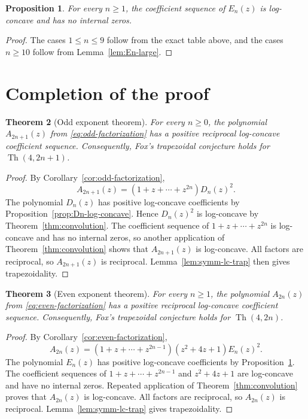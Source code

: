 \documentclass[11pt]{amsart}
\newtheorem{theorem}{Theorem}[section]
\newtheorem{proposition}[theorem]{Proposition}
\newcommand{\Th}{\operatorname{Th}}
\begin{document}
\begin{proposition}\label{prop:En-log-concave}
For every \(n\ge1\), the coefficient sequence of \(E_n(z)\) is log-concave and has no internal zeros.
\end{proposition}

\begin{proof}
The cases \(1\le n\le9\) follow from the exact table above, and the cases \(n\ge10\) follow from Lemma~\ref{lem:En-large}.
\end{proof}

\section{Completion of the proof}\label{sec:completion}

\begin{theorem}[Odd exponent theorem]\label{thm:odd-main}
For every \(n\ge0\), the polynomial \(A_{2n+1}(z)\) from \eqref{eq:odd-factorization} has a positive reciprocal log-concave coefficient sequence.  Consequently, Fox's trapezoidal conjecture holds for \(\Th(4,2n+1)\).
\end{theorem}

\begin{proof}
By Corollary~\ref{cor:odd-factorization},
\[
        A_{2n+1}(z)=(1+z+\cdots+z^{2n})D_n(z)^2.
\]
The polynomial \(D_n(z)\) has positive log-concave coefficients by Proposition~\ref{prop:Dn-log-concave}.  Hence \(D_n(z)^2\) is log-concave by Theorem~\ref{thm:convolution}.  The coefficient sequence of \(1+z+\cdots+z^{2n}\) is log-concave and has no internal zeros, so another application of Theorem~\ref{thm:convolution} shows that \(A_{2n+1}(z)\) is log-concave.  All factors are reciprocal, so \(A_{2n+1}(z)\) is reciprocal.  Lemma~\ref{lem:symm-lc-trap} then gives trapezoidality.
\end{proof}

\begin{theorem}[Even exponent theorem]\label{thm:even-main}
For every \(n\ge1\), the polynomial \(A_{2n}(z)\) from \eqref{eq:even-factorization} has a positive reciprocal log-concave coefficient sequence.  Consequently, Fox's trapezoidal conjecture holds for \(\Th(4,2n)\).
\end{theorem}

\begin{proof}
By Corollary~\ref{cor:even-factorization},
\[
        A_{2n}(z)=(1+z+\cdots+z^{2n-1})(z^2+4z+1)E_n(z)^2.
\]
The polynomial \(E_n(z)\) has positive log-concave coefficients by Proposition~\ref{prop:En-log-concave}.  The coefficient sequences of \(1+z+\cdots+z^{2n-1}\) and \(z^2+4z+1\) are log-concave and have no internal zeros.  Repeated application of Theorem~\ref{thm:convolution} proves that \(A_{2n}(z)\) is log-concave.  All factors are reciprocal, so \(A_{2n}(z)\) is reciprocal.  Lemma~\ref{lem:symm-lc-trap} gives trapezoidality.
\end{proof}
\end{document}
